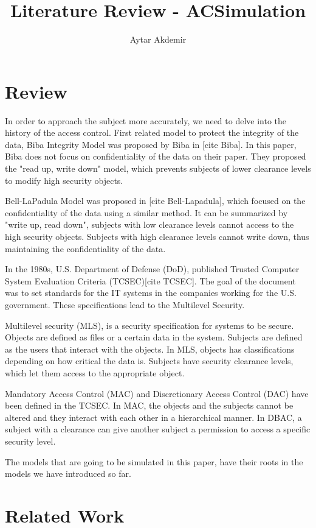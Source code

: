 \documentclass[11pt]{article} %
\title{Literature Review - ACSimulation}
\author{Aytar Akdemir}
\begin{document}
\maketitle

\section{Review}

In order to approach the subject more accurately, we need to delve into the history of the access control. First related model to protect the integrity of the data, Biba Integrity Model was proposed by Biba in [cite Biba]. In this paper, Biba does not focus on confidentiality of the data on their paper. They proposed the "read up, write down" model, which prevents subjects of lower clearance levels to modify high security objects.

Bell-LaPadula Model was proposed in [cite Bell-Lapadula], which focused on the confidentiality of the data using a similar method. It can be summarized by "write up, read down", subjects with low clearance levels cannot access to the high security objects. Subjects with high clearance levels cannot write down, thus maintaining the confidentiality of the data.

In the 1980s, U.S. Department of Defense (DoD), published  Trusted Computer System Evaluation Criteria (TCSEC)[cite TCSEC]. The goal of the document was to set standards for the IT systems in the companies working for the  U.S. government. These specifications lead to the Multilevel Security. 

Multilevel security (MLS), is a security specification for systems to be secure. Objects are defined as files or a certain data in the system. Subjects are defined as the users that interact with the objects. In MLS, objects has classifications depending on how critical the data is. Subjects have security clearance levels, which let them access to the appropriate object.

Mandatory Access Control (MAC) and Discretionary Access Control (DAC) have been defined in the TCSEC. In MAC, the objects and the subjects cannot be altered and they interact with each other in a hierarchical manner. In DBAC, a subject with a clearance can give another subject a permission to access a specific security level.

The models that are going to be simulated in this paper, have their roots in the models we have introduced so far.  

\section{Related Work}
\end{document}
